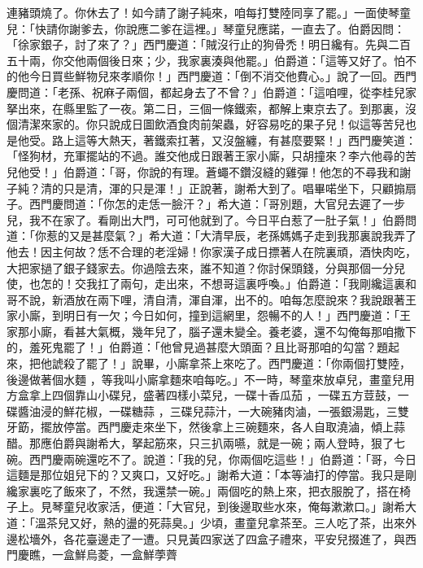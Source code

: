 連豬頭燒了。你休去了！如今請了謝子純來，咱每打雙陸同享了罷。」一面使琴童兒：「快請你謝爹去，你說應二爹在這裡。」琴童兒應諾，一直去了。伯爵因問：「徐家銀子，討了來了？」西門慶道：「賊沒行止的狗骨禿！明日纔有。先與二百五十兩，你交他兩個後日來；少，我家裏湊與他罷。」伯爵道：「這等又好了。怕不的他今日買些鮮物兒來孝順你！」西門慶道：「倒不消交他費心。」說了一回。西門慶問道：「老孫、祝麻子兩個，都起身去了不曾？」伯爵道：「這咱哩，從李桂兒家拏出來，在縣里監了一夜。第二日，三個一條鐵索，都解上東京去了。到那裏，沒個清潔來家的。你只說成日圖飲酒食肉前架蟲，好容易吃的果子兒！似這等苦兒也是他受。路上這等大熱天，著鐵索扛著，又沒盤纏，有甚麼要緊！」西門慶笑道：「怪狗材，充軍擺站的不過。誰交他成日跟著王家小廝，只胡撞來？李六他尋的苦兒他受！」伯爵道：「哥，你說的有理。蒼蠅不鑽沒縫的雞彈！他怎的不尋我和謝子純？清的只是清，渾的只是渾！」正說著，謝希大到了。唱畢喏坐下，只顧搧扇子。西門慶問道：「你怎的走恁一臉汗？」希大道：「哥別題，大官兒去遲了一步兒，我不在家了。看剛出大門，可可他就到了。今日平白惹了一肚子氣！」伯爵問道：「你惹的又是甚麼氣？」希大道：「大清早辰，老孫媽媽子走到我那裏說我弄了他去！因主何故？恁不合理的老淫婦！你家漢子成日摽著人在院裏頑，酒快肉吃，大把家撾了銀子錢家去。你過陰去來，誰不知道？你討保頭錢，分與那個一分兒使，也怎的！交我扛了兩句，走出來，不想哥這裏呼喚。」伯爵道：「我剛纔這裏和哥不說，新酒放在兩下哩，清自清，渾自渾，出不的。咱每怎麼說來？我說跟著王家小廝，到明日有一欠；今日如何，撞到這網里，怨暢不的人！」西門慶道：「王家那小廝，看甚大氣概，幾年兒了，腦子還未變全。養老婆，還不勾俺每那咱撒下的，羞死鬼罷了！」伯爵道：「他曾見過甚麼大頭面？且比哥那咱的勾當？題起來，把他諕殺了罷了！」說畢，小廝拿茶上來吃了。西門慶道：「你兩個打雙陸，後邊做著個水麵 ，等我叫小廝拿麵來咱每吃。」不一時，琴童來放卓兒，畫童兒用方盒拿上四個靠山小碟兒，盛著四樣小菜兒，一碟十香瓜茄 ，一碟五方荳鼓，一碟醬油浸的鮮花椒，一碟糖蒜 ，三碟兒蒜汁，一大碗豬肉滷，一張銀湯匙，三雙牙筯，擺放停當。西門慶走來坐下，然後拿上三碗麵來，各人自取澆滷，傾上蒜醋。那應伯爵與謝希大，拏起筋來，只三扒兩嚥，就是一碗；兩人登時，狠了七碗。西門慶兩碗還吃不了。說道：「我的兒，你兩個吃這些！」伯爵道：「哥，今日這麵是那位姐兒下的？又爽口，又好吃。」謝希大道：「本等滷打的停當。我只是剛纔家裏吃了飯來了，不然，我還禁一碗。」兩個吃的熱上來，把衣服脫了，搭在椅子上。見琴童兒收家活，便道：「大官兒，到後邊取些水來，俺每漱漱口。」謝希大道：「溫茶兒又好，熱的盪的死蒜臭。」少頃，畫童兒拿茶至。三人吃了茶，出來外邊松墻外，各花臺邊走了一遭。只見黃四家送了四盒子禮來，平安兒掇進了，與西門慶瞧，一盒鮮烏菱，一盒鮮荸薺 